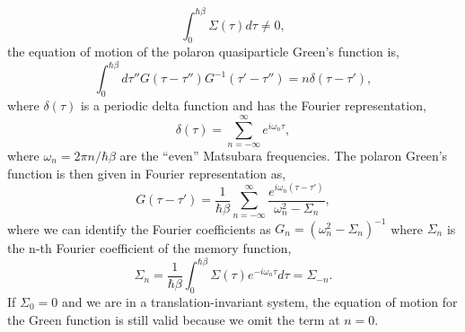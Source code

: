 \begin{equation}
    \int_0^{\hbar\beta} \Sigma(\tau) d\tau \neq 0,
\end{equation}
the equation of motion of the polaron quasiparticle Green's function is,
\begin{equation}
    \int_0^{\hbar\beta} d\tau'' G(\tau - \tau'') G^{-1}(\tau' - \tau'') = n \delta(\tau - \tau'),
\end{equation}
where $\delta(\tau)$ is a periodic delta function and has the Fourier representation,
\begin{equation}
    \delta(\tau) = \sum_{n=-\infty}^{\infty} e^{i \omega_n \tau},
\end{equation}
where $\omega_n = 2\pi n / \hbar \beta$ are the ``even'' Matsubara frequencies. The polaron Green's function is then given in Fourier representation as,
\begin{equation}
    G(\tau - \tau') = \frac{1}{\hbar\beta} \sum_{n=-\infty}^{\infty} \frac{e^{i\omega_n \left( \tau - \tau' \right)}}{\omega^2_n - \Sigma_n},
\end{equation}
where we can identify the Fourier coefficients as $G_n = (\omega^2_n - \Sigma_n)^{-1}$ where $\Sigma_n$ is the n-th Fourier coefficient of the memory function,
\begin{equation}
    \Sigma_n = \frac{1}{\hbar\beta} \int_0^{\hbar\beta} \Sigma(\tau) e^{-i\omega_n \tau} d\tau = \Sigma_{-n} .
\end{equation}
If $\Sigma_0 = 0$ and we are in a translation-invariant system, the equation of motion for the Green function is still valid because we omit the term at $n = 0$.

